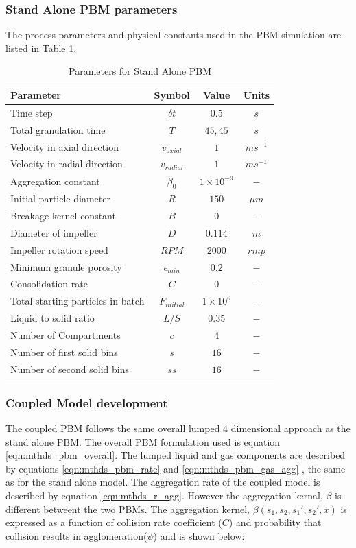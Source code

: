 \documentclass[preprint,11pt,authoryear]{elsarticle}
\begin{document}
\subsubsection{Stand Alone PBM parameters}
The process parameters and physical constants used in the PBM simulation are listed in Table
\ref{table:mthds_pbm_sa_parameters}.
\begin{table}[H]
\caption{Parameters for Stand Alone PBM}
\label{table:mthds_pbm_sa_parameters}
\begin{center}
\begin{tabular}{l|c|c|c}
\hline
\bf{Parameter} &\bf{Symbol} &\bf{Value} &\bf{Units}\\
\hline
Time step & $\delta t$ & $0.5$ & $s$\\
Total granulation time & $T$ & $45, 45$ & $s$\\
Velocity in axial direction & $v_{axial}$ & $1$ & $ms^{-1}$\\
Velocity in radial direction & $v_{radial}$ & $1$ & $ms^{-1}$\\
Aggregation constant & $\beta_0$ & $1\times10^{-9}$ & $-$\\
Initial particle diameter & $R$ & $150$ & $\mu m$\\
Breakage kernel constant & $B$ & $0$ & $-$\\
Diameter of impeller & $D$ & $0.114$ & $m$ \\
Impeller rotation speed & $RPM$ & $2000$ & $rmp$\\
Minimum granule porosity & $\epsilon_{min}$ & $0.2$ & $-$\\
Consolidation rate & $C$ & $0$ & $-$\\
Total starting particles in batch & $F_{initial}$ & $1 \times 10^{6}$ & $-$\\
Liquid to solid ratio & $L/S$ & $0.35$ & $-$ \\
Number of Compartments & $c$ & $4$ & $-$ \\
Number of first solid bins & $s$ & $16$ & $-$\\
Number of second solid bins & $ss$ & $16$ & $-$\\
\hline
\end{tabular}
\end{center}
\end{table}

\subsubsection{Coupled Model development}
 The coupled PBM follows the same overall lumped 4 dimensional approach as the stand alone PBM. The overall PBM formulation used is equation \ref{eqn:mthds_pbm_overall}. The lumped liquid and gas components are described by equations \ref{eqn:mthds_pbm_rate} and \ref{eqn:mthds_pbm_gas_agg} , the same as for the stand alone model. The aggregation rate of the coupled model is described by equation \ref{eqn:mthds_r_agg}. However the aggregation kernal, $\beta$ is different betweent the two PBMs. The aggregation kernel, $\beta(s_1,s_2, s_1',s_2',x)$ is expressed as a function of collision
rate coefficient ($C$) and probability that collision results in agglomeration($\psi$) \citep{ingram2005}
and is shown below:
\end{document}
